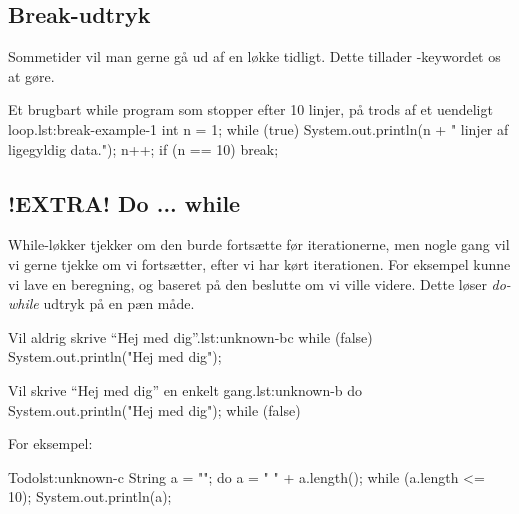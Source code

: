 	\subsection{Break-udtryk}


		Sommetider vil man gerne gå ud af en løkke tidligt. Dette tillader
		-keywordet os at gøre.

		\begin{JavaCode}{Et brugbart while program som stopper efter 10 linjer, på trods af et uendeligt loop.}{lst:break-example-1}
			int n = 1;
			while (true) {
				System.out.println(n + " linjer af ligegyldig data.");
				n++;
				if (n == 10)  break;
			}
		\end{JavaCode}



	\subsection{!EXTRA! Do ... while}


		While-løkker tjekker om den burde fortsætte før iterationerne, men nogle
		gang vil vi gerne tjekke om vi fortsætter, efter vi har kørt
		iterationen. For eksempel kunne vi lave en beregning, og baseret på den
		beslutte om vi ville videre. Dette løser \emph{do-while} udtryk på en
		pæn måde.

		\begin{JavaCode}{Vil aldrig skrive ``Hej med dig''.}{lst:unknown-bc}
			while (false) {
				System.out.println("Hej med dig");
			}
		\end{JavaCode}

		\begin{JavaCode}{Vil skrive ``Hej med dig'' en enkelt gang.}{lst:unknown-b}
			do {
				System.out.println("Hej med dig");
			} while (false)
		\end{JavaCode}

		For eksempel:

		\begin{JavaCode}{Todo}{lst:unknown-c}
			String a = "";
			do {
				a = " " + a.length();
			} while (a.length <= 10);
			System.out.println(a);
		\end{JavaCode}

